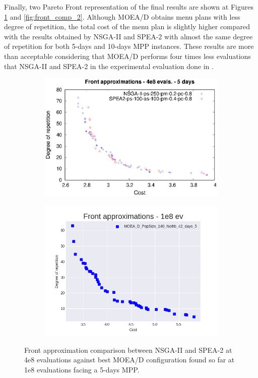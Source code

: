 Finally, two Pareto Front representation of the final results are shown at Figures \ref{fig:front_comp_1} and \ref{fig:front_comp_2}. Although MOEA/D obtains menu plans with less degree of repetition, the total cost of the menu plan is slightly higher compared with the results obtained by NSGA-II and SPEA-2 with almost the same degree of repetition for both 5-days and 10-days MPP instances. These results are more than acceptable considering that MOEA/D performs four times less evaluations that NSGA-II and SPEA-2 in the experimental evaluation done in \cite{Miranda2018}.
\begin{figure}[H]
\begin{subfigure}{.5\textwidth}
  \centering
  \includegraphics[width=1.0\linewidth]{../references/fronts_5days.eps}
\end{subfigure}%
\begin{subfigure}{.5\textwidth}
  \centering
  \includegraphics[width=1.0\linewidth]{../experiments/plots/fronts/5_days/MOEA_D_PopSize_140_Neihb_42_days_5_6.png}
\end{subfigure}
\caption{Front approximation comparison between NSGA-II and SPEA-2 at 4e8 evaluations against best MOEA/D configuration found so far at 1e8 evaluations facing a 5-days MPP.}
\label{fig:front_comp_1}
\end{figure}

